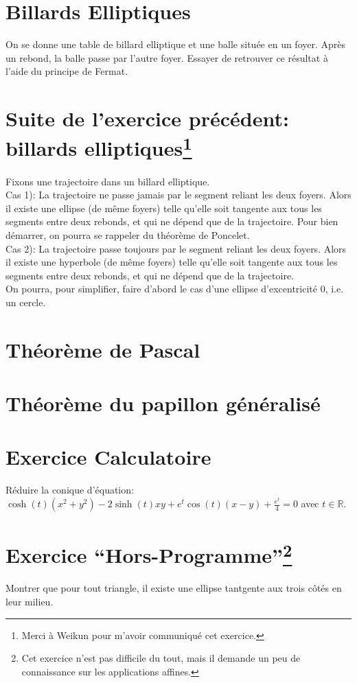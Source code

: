 \documentclass{article}
\begin{document}
\section{Billards Elliptiques}
On se donne une table de billard elliptique et une balle situ\'ee en un foyer. Apr\`es un rebond, la balle passe par l'autre foyer. Essayer de retrouver ce r\'esultat \`a l'aide du principe de Fermat.

\section{Suite de l'exercice pr\'ec\'edent: billards elliptiques\protect\footnote{Merci \`a Weikun pour m'avoir communiqu\'e cet exercice.}}
Fixons une trajectoire dans un billard elliptique.\\
Cas 1): La trajectoire ne passe jamais par le segment reliant les deux foyers. Alors il existe une ellipse (de m\^eme foyers) telle qu'elle soit tangente aux tous les segments entre deux rebonds, et qui ne d\'epend que de la trajectoire. Pour bien d\'emarrer, on pourra se rappeler du th\'eor\`eme de Poncelet.\\
Cas 2): La trajectoire passe toujours par le segment reliant les deux foyers. Alors il existe une hyperbole (de m\^eme foyers) telle qu'elle soit tangente aux tous les segments entre deux rebonds, et qui ne d\'epend que de la trajectoire.\\
On pourra, pour simplifier, faire d'abord le cas d'une ellipse d'excentricit\'e $0$, i.e. un cercle.

\section{Th\'eor\`eme de Pascal}

\section{Th\'eor\`eme du papillon g\'en\'eralis\'e}

\section{Exercice Calculatoire}
R\'eduire la conique d'\'equation: $\cosh(t)(x^2+y^2)-2\sinh(t)xy+e^t\cos(t)(x-y)+\frac{e^t}{4}=0$ avec $t\in\mathbb{R}$.

\section{Exercice ``Hors-Programme''\protect\footnote{Cet exercice n'est pas difficile du tout, mais il demande un peu de connaissance sur les applications affines.}}
Montrer que pour tout triangle, il existe une ellipse tantgente aux trois c\^ot\'es en leur milieu.
\end{document}
